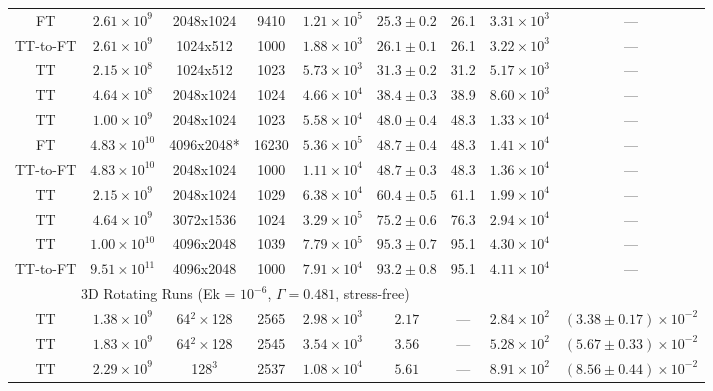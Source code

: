 \documentclass[aps, pre, onecolumn, nofootinbib, notitlepage, groupedaddress, amsfonts, amssymb, amsmath, longbibliography, superscriptaddress]{revtex4-1}
\begin{document}
\begin{table}[ht]
\begin{center}
{\begin{tabular}{c c c c c c c c c}
FT			&	$2.61 \times 10^9$		&	2048x1024	&	9410		&	$1.21 \times 10^5$	&	$25.3 \pm 0.2$	&	26.1	&	$3.31 \times 10^3$ & --- \\
TT-to-FT	&	$2.61 \times 10^9$		&	1024x512	&	1000		&	$1.88 \times 10^3$	&	$26.1 \pm 0.1$	&	26.1	&	$3.22 \times 10^3$ & --- \\
TT			&	$2.15 \times 10^8$		&	1024x512	&	1023		&	$5.73 \times 10^3$	&	$31.3 \pm 0.2$	&	31.2	&	$5.17 \times 10^3$ & --- \\
TT			&	$4.64 \times 10^8$		&	2048x1024	&	1024		&	$4.66 \times 10^4$	&	$38.4 \pm 0.3$	&	38.9	&	$8.60 \times 10^3$ & --- \\
TT			&	$1.00 \times 10^9$		&	2048x1024	&	1023		&	$5.58 \times 10^4$	&	$48.0 \pm 0.4$	&	48.3	&	$1.33 \times 10^4$ & --- \\
FT			&	$4.83 \times 10^{10}$	&	4096x2048*	&	16230		&	$5.36 \times 10^5$	&	$48.7 \pm 0.4$	&	48.3	&	$1.41 \times 10^4$ & --- \\
TT-to-FT	&	$4.83 \times 10^{10}$	&	2048x1024	&	1000		&	$1.11 \times 10^4$	&	$48.7 \pm 0.3$	&	48.3	&	$1.36 \times 10^4$ & --- \\
TT			&	$2.15 \times 10^9$		&	2048x1024	&	1029		&	$6.38 \times 10^4$	&	$60.4 \pm 0.5$	&	61.1	&	$1.99 \times 10^4$ & --- \\
TT			&	$4.64 \times 10^9$		&	3072x1536	&	1024		&	$3.29 \times 10^5$	&	$75.2 \pm 0.6$	&	76.3	&	$2.94 \times 10^4$ & --- \\
TT			&	$1.00 \times 10^{10}$	&	4096x2048	&	1039		&	$7.79 \times 10^5$	&	$95.3 \pm 0.7$	&	95.1	&	$4.30 \times 10^4$ & --- \\
TT-to-FT	&	$9.51 \times 10^{11}$	&	4096x2048	&	1000		&	$7.91 \times 10^4$	& 	$93.2 \pm 0.8$ 	&	95.1	&	$4.11 \times 10^4$ & --- \\
\hline																	
\multicolumn{7}{c}{\vspace{0.1cm}3D Rotating Runs (Ek = $10^{-6}$, $\Gamma = 0.481$, stress-free)} \\
\hline																	
TT	&	$1.38 \times 10^9$		&	64$^2\times$128 	&	2565		&	$2.98 \times 10^3$	&	$2.17$			&	---		&	$2.84 \times 10^2$  & $(3.38 \pm 0.17) \times 10^{-2}$ \\
TT	&	$1.83 \times 10^9$		&	64$^2\times$128 	&	2545		&	$3.54 \times 10^3$	&	$3.56$			&	---		&	$5.28 \times 10^2$  & $(5.67 \pm 0.33) \times 10^{-2}$ \\
TT	&	$2.29 \times 10^9$		&	128$^3$				&	2537		&	$1.08 \times 10^4$	&	$5.61$			&	---		&	$8.91 \times 10^2$  & $(8.56 \pm 0.44) \times 10^{-2}$ \\

\end{tabular}}
\end{center}
\end{table}
\end{document}
